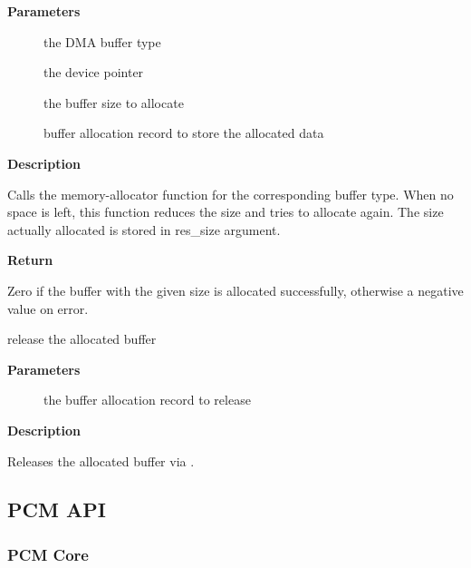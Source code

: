 \documentclass[a4paper,8pt,english]{sphinxmanual}
\begin{document}
\textbf{Parameters}
\begin{description}
\item[{}] \leavevmode
the DMA buffer type

\item[{}] \leavevmode
the device pointer

\item[{}] \leavevmode
the buffer size to allocate

\item[{}] \leavevmode
buffer allocation record to store the allocated data

\end{description}

\textbf{Description}

Calls the memory-allocator function for the corresponding
buffer type.  When no space is left, this function reduces the size and
tries to allocate again.  The size actually allocated is stored in
res\_size argument.

\textbf{Return}

Zero if the buffer with the given size is allocated successfully,
otherwise a negative value on error.

\begin{fulllineitems}
\label{sound/kernel-api/alsa-driver-api:c.snd_dma_free_pages}
release the allocated buffer

\end{fulllineitems}


\textbf{Parameters}
\begin{description}
\item[{}] \leavevmode
the buffer allocation record to release

\end{description}

\textbf{Description}

Releases the allocated buffer via .


\subsection{PCM API}
\label{sound/kernel-api/alsa-driver-api:pcm-api}

\subsubsection{PCM Core}
\label{sound/kernel-api/alsa-driver-api:pcm-core}
\end{document}
